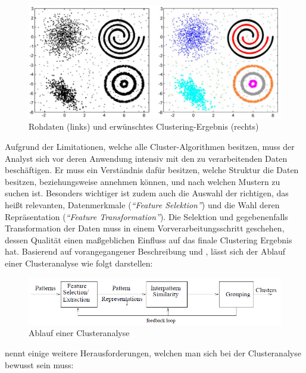 \begin{figure}[H]
    \centering
    \includegraphics[width=0.8\linewidth]{../resources/img/grundlagen/clustering_example}
    \caption[Rohdaten (links) und erwünschtes Clustering-Ergebnis (rechts)]{Rohdaten (links) und erwünschtes Clustering-Ergebnis (rechts) \cite[]{Jain2010}}
    \label{fig:grund_clustering_example}
\end{figure}

Aufgrund der Limitationen, welche alle Cluster-Algorithmen besitzen, muss der Analyst sich vor deren Anwendung intensiv
mit den zu verarbeitenden Daten beschäftigen. Er muss ein Verständnis dafür besitzen, welche Struktur die Daten
besitzen, beziehungsweise annehmen können, und nach welchen Mustern zu suchen ist.
Besonders wichtiger ist zudem auch die Auswahl der richtigen, das heißt relevanten, Datenmerkmale (\textit{``Feature Selektion''})
und die Wahl deren Repräsentation (\textit{``Feature Transformation''}).
Die Selektion und gegebenenfalls Transformation der Daten muss in einem
Vorverarbeitungsschritt geschehen, dessen Qualität einen maßgeblichen Einfluss auf das finale Clustering Ergebnis hat.
Basierend auf vorangegangener Beschreibung und \cite[]{Jain1999}, lässt sich der Ablauf einer Clusteranalyse wie folgt darstellen:

\begin{figure}[H]
    \centering
    \includegraphics[width=0.8\linewidth]{../resources/img/grundlagen/clustering_workflow}
    \caption{Ablauf einer Clusteranalyse}
    \label{fig:grund_clustering_workflow}
\end{figure}

\cite[]{Jain2010} nennt einige weitere Herausforderungen, welchen man sich bei der Clusteranalyse bewusst sein muss:


